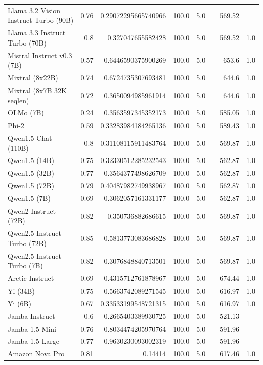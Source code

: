 \begin{table}[htp]
{\begin{tabular}{lrrrrrrr}
Llama 3.2 Vision Instruct Turbo (90B) & 0.76 & 0.29072295665740966 & 100.0 & 5.0 &  & 569.52 &  \\
Llama 3.3 Instruct Turbo (70B) & 0.8 & 0.327047655582428 & 100.0 & 5.0 &  & 569.52 & 1.0 \\
Mistral Instruct v0.3 (7B) & 0.57 & 0.6446590375900269 & 100.0 & 5.0 &  & 653.6 & 1.0 \\
Mixtral (8x22B) & 0.74 & 0.6724735307693481 & 100.0 & 5.0 &  & 644.6 & 1.0 \\
Mixtral (8x7B 32K seqlen) & 0.72 & 0.3650094985961914 & 100.0 & 5.0 &  & 644.6 & 1.0 \\
OLMo (7B) & 0.24 & 0.3563597345352173 & 100.0 & 5.0 &  & 585.05 & 1.0 \\
Phi-2 & 0.59 & 0.33283984184265136 & 100.0 & 5.0 &  & 589.43 & 1.0 \\
Qwen1.5 Chat (110B) & 0.8 & 0.31108115911483764 & 100.0 & 5.0 &  & 569.87 & 1.0 \\
Qwen1.5 (14B) & 0.75 & 0.32330512285232543 & 100.0 & 5.0 &  & 562.87 & 1.0 \\
Qwen1.5 (32B) & 0.77 & 0.3564377498626709 & 100.0 & 5.0 &  & 562.87 & 1.0 \\
Qwen1.5 (72B) & 0.79 & 0.40487982749938967 & 100.0 & 5.0 &  & 562.87 & 1.0 \\
Qwen1.5 (7B) & 0.69 & 0.3062057161331177 & 100.0 & 5.0 &  & 562.87 & 1.0 \\
Qwen2 Instruct (72B) & 0.82 & 0.350736882686615 & 100.0 & 5.0 &  & 569.87 & 1.0 \\
Qwen2.5 Instruct Turbo (72B) & 0.85 & 0.5813773083686828 & 100.0 & 5.0 &  & 569.87 & 1.0 \\
Qwen2.5 Instruct Turbo (7B) & 0.82 & 0.3076848840713501 & 100.0 & 5.0 &  & 569.87 & 1.0 \\
Arctic Instruct & 0.69 & 0.4315712761878967 & 100.0 & 5.0 &  & 674.44 & 1.0 \\
Yi (34B) & 0.75 & 0.5663742089271545 & 100.0 & 5.0 &  & 616.97 & 1.0 \\
Yi (6B) & 0.67 & 0.33533199548721315 & 100.0 & 5.0 &  & 616.97 & 1.0 \\
Jamba Instruct & 0.6 & 0.2665403389930725 & 100.0 & 5.0 &  & 521.13 &  \\
Jamba 1.5 Mini & 0.76 & 0.8034474205970764 & 100.0 & 5.0 &  & 591.96 &  \\
Jamba 1.5 Large & 0.77 & 0.9630230093002319 & 100.0 & 5.0 &  & 591.96 &  \\
Amazon Nova Pro & 0.81 & 0.14414 & 100.0 & 5.0 &  & 617.46 & 1.0 \\

\end{tabular}}
\end{table}
